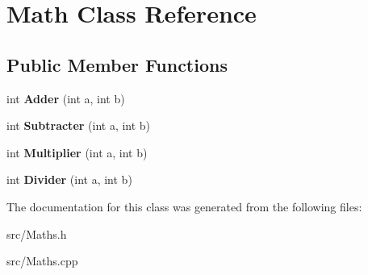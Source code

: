 \hypertarget{class_math}{}\section{Math Class Reference}
\label{class_math}
\subsection*{Public Member Functions}
\begin{DoxyCompactItemize}
\item 
int {\bfseries Adder} (int a, int b)\hypertarget{class_math_a426a739228b7b944728cf0c20fe6df8b}{}\label{class_math_a426a739228b7b944728cf0c20fe6df8b}

\item 
int {\bfseries Subtracter} (int a, int b)\hypertarget{class_math_ad9d2a1627678a6098f39bbd0dfff104a}{}\label{class_math_ad9d2a1627678a6098f39bbd0dfff104a}

\item 
int {\bfseries Multiplier} (int a, int b)\hypertarget{class_math_a89aa8745543a1e6379bbae741197f125}{}\label{class_math_a89aa8745543a1e6379bbae741197f125}

\item 
int {\bfseries Divider} (int a, int b)\hypertarget{class_math_a22b7548e29096a84cdba8bb224e4e189}{}\label{class_math_a22b7548e29096a84cdba8bb224e4e189}

\end{DoxyCompactItemize}


The documentation for this class was generated from the following files\+:\begin{DoxyCompactItemize}
\item 
src/Maths.\+h\item 
src/Maths.\+cpp\end{DoxyCompactItemize}
